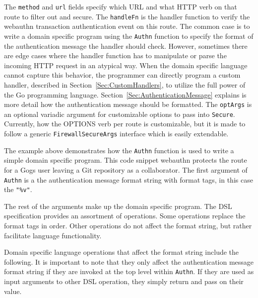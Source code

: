 
The \lstinline{method} and \lstinline{url} fields specify which URL and what HTTP verb on that route to filter out and secure. The \lstinline{handleFn} is the handler function to verify the webauthn transaction authentication event on this route. The common case is to write a domain specific program using the \lstinline{Authn} function to specify the format of the authentication message the handler should check. However, sometimes there are edge cases where the handler function has to manipulate or parse the incoming HTTP request in an atypical way. When the domain specific language cannot capture this behavior, the programmer can directly program a custom handler, described in Section~\ref{Sec:CustomHandlers}, to utilize the full power of the Go programming language. Section~\ref{Sec:AuthenticationMessage} explains is more detail how the authentication message should be formatted. The \lstinline{optArgs} is an optional variadic argument for customizable options to pass into \lstinline{Secure}. Currently, how the OPTIONS verb per route is customizable, but it is made to follow a generic \lstinline{FirewallSecureArgs} interface which is easily extendable. 

The example above demonstrates how the \lstinline{Authn} function is used to write a simple domain specific program. This code snippet webauthn protects the route for a Gogs user leaving a Git repository as a collaborator. The first argument of \lstinline{Authn} is a the authentication message format string with format tags, in this case the \lstinline{"%v"}. 

The rest of the arguments make up the domain specific program. The DSL specification provides an assortment of operations. Some operations replace the format tags in order. Other operations do not affect the format string, but rather facilitate language functionality. 

Domain specific language operations that affect the format string include the following. It is important to note that they only affect the authentication message format string if they are invoked at the top level within \lstinline{Authn}. If they are used as input arguments to other DSL operation, they simply return and pass on their value.

